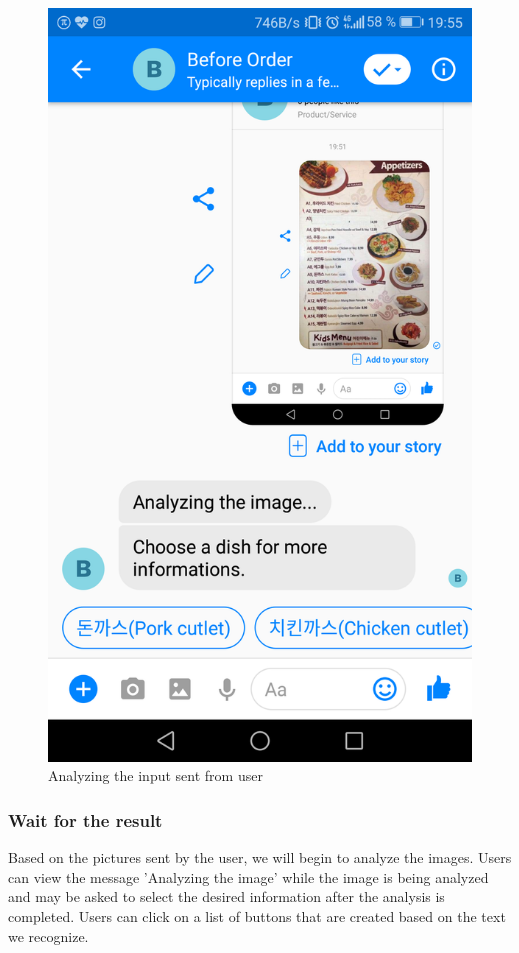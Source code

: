 \begin{figure}[htbp]
\centerline{\includegraphics[height=\custompicheight]{./pictures/facebook_analysis}}
\caption{Analyzing the input sent from user}
\label{fig:Before Order_analyze_input}
\end{figure}
\FloatBarrier
\subsubsection{Wait for the result}
 Based on the pictures sent by the user, we will begin to analyze the images. Users can view the message 'Analyzing the image' while the image is being analyzed and may be asked to select the desired information after the analysis is completed. Users can click on a list of buttons that are created based on the text we recognize.



